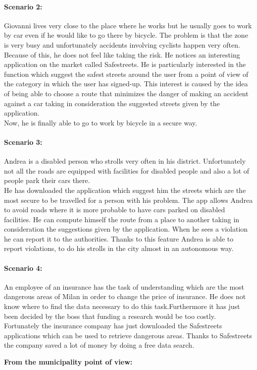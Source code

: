 \documentclass[titlepage]{article}
\begin{document}
\paragraph{Scenario 2:}Giovanni lives very close to the place where he works but he usually goes to work by car even if he would like to go there by bicycle. The problem is that the zone is very busy and unfortunately accidents involving cyclists happen very often. Because of this, he does not feel like taking the risk.
He notices an interesting application on the market called Safestreets. He is particularly interested in the function which suggest the safest streets around the user from a point of view of the category in which the user has signed-up. This interest is caused by the idea of ​​being able to choose a route that minimizes the danger of making an accident against a car taking in consideration the suggested streets given by the application.\\
Now, he is finally able to go to work by bicycle in a secure way.
\paragraph{Scenario 3:}Andrea is a disabled person who strolls very often in his district. Unfortunately not all the roads are equipped with facilities for disabled people and also a lot of people park their cars there.\\
He has downloaded the application which suggest him the streets which are the most secure to be travelled for a person with his problem. The app allows Andrea to avoid roads where it is more probable to have cars parked on disabled facilities. He can compute himself the route from a place to another taking in consideration the suggestions given by the application. When he sees a violation he can report it to the authorities. Thanks to this feature Andrea is able to report violations, to do his strolls in the city almost in an autonomous way.
\paragraph{Scenario 4:} An employee of an insurance has the task of understanding which are the most dangerous areas of Milan in order to change the price of insurance. He does not know where to find the data necessary to do this task.Furthermore it has just been decided by the boss that funding a research would be too costly.\\
Fortunately the insurance company has just downloaded the Safestreets applications which can be used to retrieve dangerous areas. Thanks to Safestreets the company saved a lot of money by doing a free data search.\newpage
\begin{center}
	\textbf{From the municipality point of view:}
\end{center}
\end{document}
